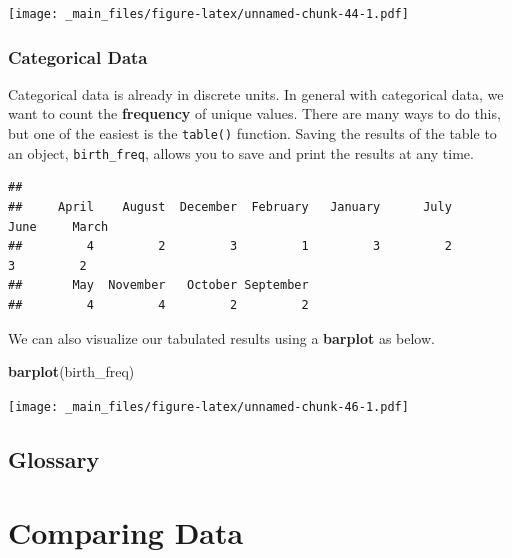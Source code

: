 \documentclass[
]{book}
\newenvironment{Shaded}{\begin{snugshade}}{\end{snugshade}}
\newcommand{\FunctionTok}[1]{\textcolor[rgb]{0.13,0.29,0.53}{\textbf{#1}}}
\newcommand{\NormalTok}[1]{#1}
\newcommand{\OtherTok}[1]{\textcolor[rgb]{0.56,0.35,0.01}{#1}}
\newcommand{\SpecialCharTok}[1]{\textcolor[rgb]{0.81,0.36,0.00}{\textbf{#1}}}
\begin{document}
\texttt{[image: \_main\_files/figure-latex/unnamed-chunk-44-1.pdf]}

\hypertarget{categorical-data}{%
\subsection{Categorical Data}\label{categorical-data}}

Categorical data is already in discrete units. In general with categorical data, we want to count the \textbf{frequency} of unique values. There are many ways to do this, but one of the easiest is the \texttt{table()} function. Saving the results of the table to an object, \texttt{birth\_freq}, allows you to save and print the results at any time.

\begin{Shaded}
\end{Shaded}

\begin{verbatim}
## 
##     April    August  December  February   January      July      June     March 
##         4         2         3         1         3         2         3         2 
##       May  November   October September 
##         4         4         2         2
\end{verbatim}

We can also visualize our tabulated results using a \textbf{barplot} as below.

\begin{Shaded}
\begin{Highlighting}[]
\FunctionTok{barplot}\NormalTok{(birth\_freq)}
\end{Highlighting}
\end{Shaded}

\texttt{[image: \_main\_files/figure-latex/unnamed-chunk-46-1.pdf]}

\hypertarget{glossary-2}{%
\section*{Glossary}\label{glossary-2}}

\hypertarget{comparing-data}{%
\chapter{Comparing Data}\label{comparing-data}}
\end{document}
